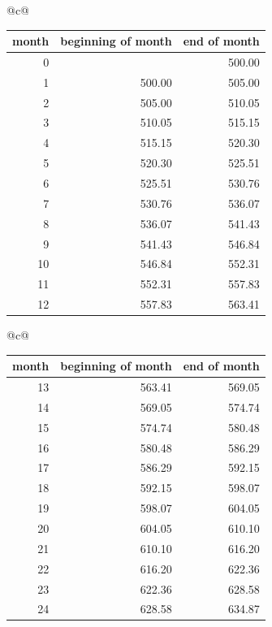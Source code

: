 \begin{sol}
 


\begin{center}
\begin{tabular}[t]{@{}c@{}}
\footnotesize\setlength{\tabcolsep}{4pt}
\begin{tabular}[t]{rrr}
\hline
\textbf{month} & \textbf{beginning of month} & \textbf{end of month} \\
\hline
0 &  & 500.00 \\
1 & 500.00 & 505.00 \\
2 & 505.00 & 510.05 \\
3 & 510.05 & 515.15 \\
4 & 515.15 & 520.30 \\
5 & 520.30 & 525.51 \\
6 & 525.51 & 530.76 \\
7 & 530.76 & 536.07 \\
8 & 536.07 & 541.43 \\
9 & 541.43 & 546.84 \\
10 & 546.84 & 552.31 \\
11 & 552.31 & 557.83 \\
12 & 557.83 & 563.41 \\
\hline
\end{tabular}
\end{tabular}
\qquad
\begin{tabular}[t]{@{}c@{}}
\footnotesize\setlength{\tabcolsep}{4pt}
\begin{tabular}[t]{rrr}
\hline
\textbf{month} & \textbf{beginning of month} & \textbf{end of month} \\
\hline
13 & 563.41 & 569.05 \\
14 & 569.05 & 574.74 \\
15 & 574.74 & 580.48 \\
16 & 580.48 & 586.29 \\
17 & 586.29 & 592.15 \\
18 & 592.15 & 598.07 \\
19 & 598.07 & 604.05 \\
20 & 604.05 & 610.10 \\
21 & 610.10 & 616.20 \\
22 & 616.20 & 622.36 \\
23 & 622.36 & 628.58 \\
24 & 628.58 & 634.87 \\
\hline
\end{tabular}
\end{tabular}
\end{center}




\end{sol}
